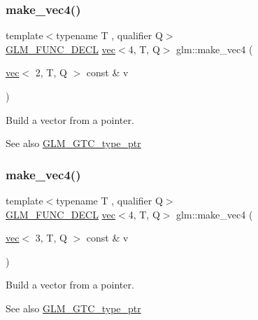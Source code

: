 \subsubsection{\texorpdfstring{make\+\_\+vec4()}{make\_vec4()}\hspace{0.1cm}{\footnotesize\ttfamily [2/5]}}
{\footnotesize\ttfamily template$<$typename T , qualifier Q$>$ \\
\mbox{\hyperlink{setup_8hpp_ab2d052de21a70539923e9bcbf6e83a51}{G\+L\+M\+\_\+\+F\+U\+N\+C\+\_\+\+D\+E\+CL}} \mbox{\hyperlink{structglm_1_1vec}{vec}}$<$4, T, Q$>$ glm\+::make\+\_\+vec4 (\begin{DoxyParamCaption}\item[{\mbox{\hyperlink{structglm_1_1vec}{vec}}$<$ 2, T, Q $>$ const \&}]{v }\end{DoxyParamCaption})\hspace{0.3cm}{\ttfamily [inline]}}

Build a vector from a pointer. \begin{DoxySeeAlso}{See also}
\mbox{\hyperlink{group__gtc__type__ptr}{G\+L\+M\+\_\+\+G\+T\+C\+\_\+type\+\_\+ptr}} 
\end{DoxySeeAlso}
\mbox{\label{group__gtc__type__ptr_ga4036328ba4702c74cbdfad1fc03d1b8f}} 
\subsubsection{\texorpdfstring{make\+\_\+vec4()}{make\_vec4()}\hspace{0.1cm}{\footnotesize\ttfamily [3/5]}}
{\footnotesize\ttfamily template$<$typename T , qualifier Q$>$ \\
\mbox{\hyperlink{setup_8hpp_ab2d052de21a70539923e9bcbf6e83a51}{G\+L\+M\+\_\+\+F\+U\+N\+C\+\_\+\+D\+E\+CL}} \mbox{\hyperlink{structglm_1_1vec}{vec}}$<$4, T, Q$>$ glm\+::make\+\_\+vec4 (\begin{DoxyParamCaption}\item[{\mbox{\hyperlink{structglm_1_1vec}{vec}}$<$ 3, T, Q $>$ const \&}]{v }\end{DoxyParamCaption})\hspace{0.3cm}{\ttfamily [inline]}}

Build a vector from a pointer. \begin{DoxySeeAlso}{See also}
\mbox{\hyperlink{group__gtc__type__ptr}{G\+L\+M\+\_\+\+G\+T\+C\+\_\+type\+\_\+ptr}} 
\end{DoxySeeAlso}
\mbox{\label{group__gtc__type__ptr_gaa95cb15732f708f613e65a0578895ae5}} 
